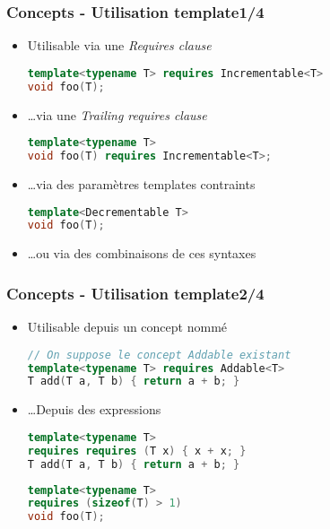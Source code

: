 \documentclass[C++.tex]{subfiles}
\begin{document}
\begin{frame}[fragile]
	\frametitle{Concepts - Utilisation template\titlehfill{}1/4}
	\begin{itemize}
		\item Utilisable via une \textit{Requires clause}

		\begin{lstlisting}[language=C++]
template<typename T> requires Incrementable<T>
void foo(T);\end{lstlisting}

		\item \ldots via une \textit{Trailing requires clause}

		\begin{lstlisting}[language=C++]
template<typename T>
void foo(T) requires Incrementable<T>;\end{lstlisting}
		
		
		\item \ldots via des paramètres templates contraints

		\begin{lstlisting}[language=C++]
template<Decrementable T>
void foo(T);\end{lstlisting}

		\item \ldots ou via des combinaisons de ces syntaxes
	\end{itemize}
\end{frame}

\begin{frame}[fragile]
	\frametitle{Concepts - Utilisation template\titlehfill{}2/4}
	\begin{itemize}
		\item Utilisable depuis un concept nommé

		\begin{lstlisting}[language=C++]
// On suppose le concept Addable existant
template<typename T> requires Addable<T>
T add(T a, T b) { return a + b; }\end{lstlisting}

		\item \ldots Depuis des expressions
 
		\begin{lstlisting}[language=C++]
template<typename T>
requires requires (T x) { x + x; }
T add(T a, T b) { return a + b; }\end{lstlisting}

		\begin{lstlisting}[language=C++]
template<typename T>
requires (sizeof(T) > 1)
void foo(T);\end{lstlisting}

	\end{itemize}
\end{frame}
\end{document}
